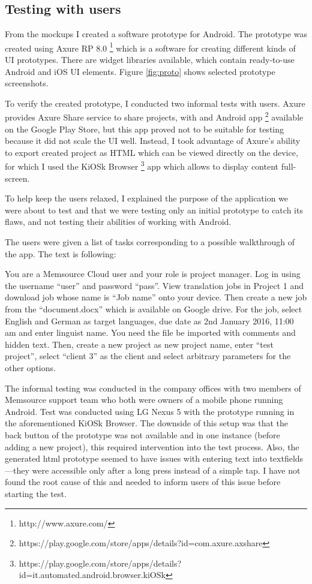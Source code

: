 \subsection{Testing with users}

From the mockups I created a software prototype for Android. The prototype was created using Axure RP 8.0 \footnote{http://www.axure.com/} which is a software for creating different kinds of UI prototypes. There are widget libraries available, which contain ready-to-use Android and iOS UI elements. Figure \ref{fig:proto} shows selected prototype screenshots.

To verify the created prototype, I conducted two informal tests with users. Axure provides Axure Share service to share projects, with and Android app \footnote{https://play.google.com/store/apps/details?id=com.axure.axshare} available on the Google Play Store, but this app proved not to be suitable for testing because it did not scale the UI well. Instead, I took advantage of Axure's ability to export created project as HTML which can be viewed directly on the device, for which I used the KiOSk Browser \footnote{https://play.google.com/store/apps/details?id=it.automated.android.browser.kiOSk} app which allows to display content full-screen. 

To help keep the users relaxed, I explained the purpose of the application we were about to test and that we were testing only an initial prototype to catch its flaws, and not testing their abilities of working with Android.

The users were given a list of tasks corresponding to a possible walkthrough of the app. The text is following: 

You are a Memsource Cloud user and your role is project manager. Log in using the username ``user'' and password ``pass''. View translation jobs in Project 1 and download job whose name is ``Job name'' onto your device. Then create a new job from the ``document.docx'' which is available on Google drive. For the job, select English and German as target languages, due date as 2nd January 2016, 11:00 am and enter linguist name. You need the file be imported with comments and hidden text. Then, create a new project as new project name, enter ``test project'', select ``client 3'' as the client and select arbitrary parameters for the other options.

The informal testing was conducted in the company offices with two members of Memsource support team who both were owners of a mobile phone running Android. Test was conducted using LG Nexus 5 with the prototype running in the aforementioned KiOSk Browser. The downside of this setup was that the back button of the prototype was not available and in one instance (before adding a new project), this required intervention into the test process. Also, the generated html prototype seemed to have issues with entering text into textfields---they were accessible only after a long press instead of a simple tap. I have not found the root cause of this and needed to inform users of this issue before starting the test.

